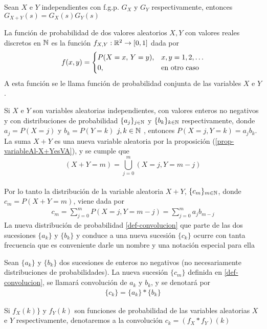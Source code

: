 \begin{Prop}
    Sean $X$ e $Y$ independientes con f.g.p. $G_X$ y $G_Y$ respectivamente, entonces $G_{X+Y}(s)=G_X(s)G_Y(s)$
    \label{prop-funcionGenSuma-productoFuncionGen}
\end{Prop}
\begin{Def} 
    La función de probabilidad de dos valores aleatorios $X, Y$ con valores reales discretos en ${\mathbb{N}}$ es la función $f_{X,Y} :{\mathbb{R}}^2 \rightarrow [0, 1]$ dada por
    $$f(x,y)=
    \begin{cases}
        P(X=x,\thinspace Y=y), & \mbox{$x,y=1,2,\ldots$}\\
        0,& \mbox{en otro caso}
    \end{cases}$$
    A esta función se le llama función de probabilidad conjunta de las variables $X$ e $Y$.
\end{Def}
Si $X$ e $Y$ son variables aleatorias independientes, con valores enteros no negativos y con distribuciones de probabilidad $\{a_j\}_{j\in{\mathbb{N}}}$ y $\{b_k\}_{k\in{\mathbb{N}}}$ respectivamente, donde $a_j=P(X=j)$ y  $b_k=P(Y=k)$ $j,k\in{\mathbb{N}}$ , entonces $P(X=j,Y=k)=a_j b_k$.\\ La suma $X+Y$ es una nueva variable aleatoria por la proposición (\ref{prop-variableAl-X+YesVA}), y se cumple que $$(X+Y=m)=\bigcup_{j=0}^{m}(X=j,Y=m-j)$$ \\ Por lo tanto la distribución de la variable aleatoria $X+Y$, $\{c_m\}_{m\in{\mathbb{N}}}$, donde $c_m=P(X+Y=m)$, viene dada por
\begin{eqnarray}
    c_m=\sum_{j=0}^m P(X=j,Y=m-j)=\sum_{j=0}^m a_j b_{m-j}\label{def-convolucion}
\end{eqnarray}
La nueva distribución de probabilidad \ref{def-convolucion} que parte de las dos sucesiones $\{a_k\}$ y $\{b_k\}$ y conduce a una nueva sucesión $\{c_k\}$ ocurre con tanta frecuencia que es conveniente darle un nombre y una notación especial para ella
\begin{Def}
    Sean $\{a_k\}$ y $\{b_k\}$ dos sucesiones de enteros no negativos (no necesariamente distribuciones de probabilidades). La nueva sucesión $\{c_m\}$ definida en \ref{def-convolucion}, se llamará convolución de $a_k$ y $b_k$, y se denotará por
    \begin{eqnarray}
        \{c_k\}=\{a_k\}*\{b_k\}
        \label{def-notaciónConvolucion}
    \end{eqnarray}
\end{Def}
\begin{Obs}
    Si $f_X(k)\}$ y $f_Y(k)$ son funciones de probabilidad de las variables aleatorias $X$ e $Y$ respectivamente, denotaremos a la convolución $c_k=(f_X*f_Y)(k)$
\end{Obs}

